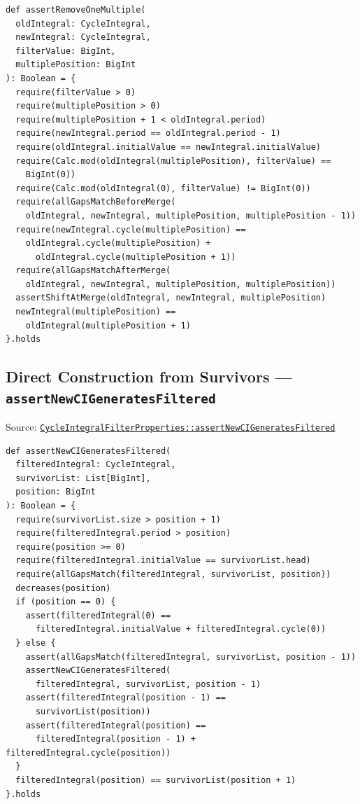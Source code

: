 \begin{lstlisting}[style=scala]
def assertRemoveOneMultiple(
  oldIntegral: CycleIntegral,
  newIntegral: CycleIntegral,
  filterValue: BigInt,
  multiplePosition: BigInt
): Boolean = {
  require(filterValue > 0)
  require(multiplePosition > 0)
  require(multiplePosition + 1 < oldIntegral.period)
  require(newIntegral.period == oldIntegral.period - 1)
  require(oldIntegral.initialValue == newIntegral.initialValue)
  require(Calc.mod(oldIntegral(multiplePosition), filterValue) ==
    BigInt(0))
  require(Calc.mod(oldIntegral(0), filterValue) != BigInt(0))
  require(allGapsMatchBeforeMerge(
    oldIntegral, newIntegral, multiplePosition, multiplePosition - 1))
  require(newIntegral.cycle(multiplePosition) ==
    oldIntegral.cycle(multiplePosition) +
      oldIntegral.cycle(multiplePosition + 1))
  require(allGapsMatchAfterMerge(
    oldIntegral, newIntegral, multiplePosition, multiplePosition))
  assertShiftAtMerge(oldIntegral, newIntegral, multiplePosition)
  newIntegral(multiplePosition) ==
    oldIntegral(multiplePosition + 1)
}.holds
\end{lstlisting}

\subsection{Direct Construction from Survivors --- \texorpdfstring{\texttt{assert\allowbreak New\allowbreak CIGenerates\allowbreak Filtered}}{assertNewCIGeneratesFiltered}}

{\raggedright Source: \href{https://github.com/thiagomata/prime-numbers/blob/integral-cycle-article-v1.0.0/src/main/scala/v1/chapter4/cycle/integral/recursive/properties/CycleIntegralFilterProperties.scala}{\texttt{Cycle\allowbreak Integral\allowbreak Filter\allowbreak Properties::assert\allowbreak New\allowbreak CIGenerates\allowbreak Filtered}}\par}

\begin{lstlisting}[style=scala]
def assertNewCIGeneratesFiltered(
  filteredIntegral: CycleIntegral,
  survivorList: List[BigInt],
  position: BigInt
): Boolean = {
  require(survivorList.size > position + 1)
  require(filteredIntegral.period > position)
  require(position >= 0)
  require(filteredIntegral.initialValue == survivorList.head)
  require(allGapsMatch(filteredIntegral, survivorList, position))
  decreases(position)
  if (position == 0) {
    assert(filteredIntegral(0) ==
      filteredIntegral.initialValue + filteredIntegral.cycle(0))
  } else {
    assert(allGapsMatch(filteredIntegral, survivorList, position - 1))
    assertNewCIGeneratesFiltered(
      filteredIntegral, survivorList, position - 1)
    assert(filteredIntegral(position - 1) ==
      survivorList(position))
    assert(filteredIntegral(position) ==
      filteredIntegral(position - 1) + filteredIntegral.cycle(position))
  }
  filteredIntegral(position) == survivorList(position + 1)
}.holds
\end{lstlisting}

